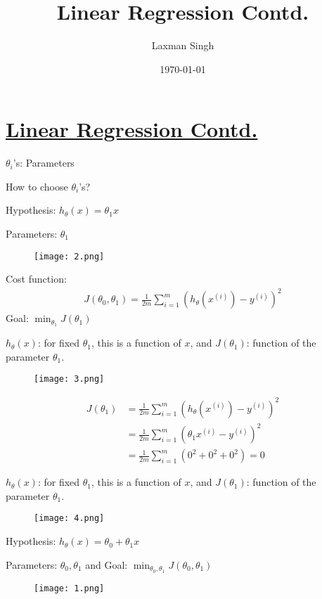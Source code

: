 \documentclass[12pt,a4paper,fleqn]{article}
\author{Laxman Singh}
\date{\today}
\title{Linear Regression Contd.}
\begin{document}
\section{  \underline{ Linear Regression Contd. }  } 
  \(\theta_i\)'s: Parameters

 How to choose \(\theta_i\)'s? 

 Hypothesis: \(h_\theta(x)=\theta_1 x\)
 
 Parameters: \(\theta_1\)
 \begin{figure}[ht]
     \centering
     \texttt{[image: 2.png]}
 \end{figure}
 
 Cost function:
  \begin{align*}
  J\left(\theta_0, \theta_1\right)=\frac{1}{2 m} \sum_{i=1}^m{\left(h_\theta\left(x^{(i)}\right)-y^{(i)}\right)}^2
  \end{align*}
 Goal: \(\min _{\theta_1} J\left(\theta_1\right)\)

 \(h_{\theta}(x)\): for fixed \(\theta_{1}\), this is a function of \(x\), and \(J(\theta_{1})\): function of the parameter \(\theta_{1}\).      
 \begin{figure}[ht]
     \centering
     \texttt{[image: 3.png]}
 \end{figure}
 
  \begin{align*}
    J\left(\theta_1\right)&=\frac{1}{2 m} \sum_{i=1}^m{\left(h_\theta\left(x^{(i)}\right)-y^{(i)}\right)}^2\\
    &=\frac{1}{2 m} \sum_{i=1}^m{\left(\theta_1 x^{(i)}-y^{(i)}\right)}^2\\
    &=\frac{1}{2 m} \sum_{i=1}^m\left(0^2+0^2+0^2\right)=0
 \end{align*}

 \(h_{\theta}(x)\): for fixed \(\theta_{1}\), this is a function of \(x\), and \(J(\theta_{1})\): function of the parameter \(\theta_{1}\).      

 \begin{figure}[ht]
     \centering
     \texttt{[image: 4.png]}
 \end{figure}

 Hypothesis: \(h_\theta(x)=\theta_0+\theta_1 x\)
 
 Parameters: \(\theta_0, \theta_1\) and  Goal: \(\min _{\theta_{0},\theta_1} J\left(\theta_{0},\theta_1\right)\)
 \begin{figure}[ht]
    \centering
    \texttt{[image: 1.png]}
 \end{figure}
 
\end{document}
